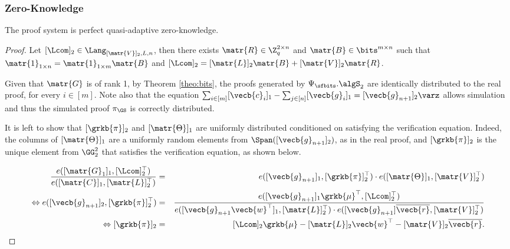 \subsubsection{Zero-Knowledge}

\begin{theorem}
The proof system is perfect quasi-adaptive zero-knowledge.
\end{theorem}

\begin{proof}
Let $[\Lcom]_2\in\Lang_{[\matr{V}]_2,L,n}$, then there exists $\matr{R}\in\Z_q^{2\times n}$ and $\matr{B}\in\bits^{m\times n}$ such that $\matr{1}_{1\times n} = \matr{1}_{1\times m}\matr{B}$ and $[\Lcom]_2=[\matr{L}]_2\matr{B}+[\matr{V}]_2\matr{R}$.

Given that $\matr{G}$ is of rank 1, by Theorem \ref{theo:bits}, the proofs generated by $\Psi_\sfbits.\algS_2$ are identically distributed to the real proof, for every $i\in[m]$. Note also that the equation $\sum_{i\in[m]}[\vecb{c}_i]_1-\sum_{j\in[n]}[\vecb{g}_i]_1=[\vecb{g}_{n+1}]_2\varz$ allows simulation and thus the simulated proof $\pi_\GS$ is correctly distributed.

It is left to show that $[\grkb{\pi}]_2$ and $[\matr{\Theta}]_1$ are uniformly distributed conditioned on satisfying the verification equation. 
Indeed, the columns of $[\matr{\Theta}]_1$ are a uniformly random elements from $\Span([\vecb{g}_{n+1}]_2)$, as in the real proof, and $[\grkb{\pi}]_2$ is the unique element from $\GG_2^2$ that satisfies the verification equation, as shown below.

\begin{eqnarray*}
\dfrac{e([\matr{G}_1]_1,[\Lcom]_2^\top)}{e([\matr{C}]_1,[\matr{L}]_2^\top)} &=& e([\vecb{g}_{n+1}]_1,[\grkb{\pi}]_2^\top)\cdot e([\matr{\Theta}]_1,[\matr{V}]_2^\top)\\
\Leftrightarrow e([\vecb{g}_{n+1}]_2,[\grkb{\pi}]_2^\top)   & = &
    \dfrac{e([\vecb{g}_{n+1}]_1\grkb{\mu}^\top,[\Lcom]_2^\top)}{e([\vecb{g}_{n+1}\vecb{w}^\top]_1,[\matr{L}]_2^\top)\cdot e([\vecb{g}_{n+1}]\overline{\vecb{r}},[\matr{V}]_2^\top)}\\
\Leftrightarrow [\grkb{\pi}]_2 & = & [\Lcom]_2\grkb{\mu} - [\matr{L}]_2\vecb{w}^\top-[\matr{V}]_2\overline{\vecb{r}}.
\end{eqnarray*}
\end{proof}
